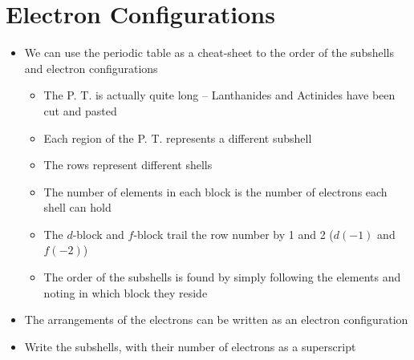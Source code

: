 \documentclass[12pt, openany, letterpaper]{memoir}
\begin{document}
\section{Electron Configurations}
\begin{itemize}
	\item We can use the periodic table as a cheat-sheet to the order of the subshells and electron configurations
	\begin{itemize}
		\item The P. T. is actually quite long -- Lanthanides and Actinides have been cut and pasted
		\item Each region of the P. T. represents a different subshell
		\item The rows represent different shells
		\item The number of elements in each block is the number of electrons each shell can hold
		\item The $d$-block and $f$-block trail the row number by 1 and 2 ($d(-1)$ and $f(-2)$)
		\item The order of the subshells is found by simply following the elements and noting in which block they reside
	\end{itemize}
	\item The arrangements of the electrons can be written as an electron configuration
	\item Write the subshells, with their number of electrons as a superscript
	

\end{itemize}
\end{document}
